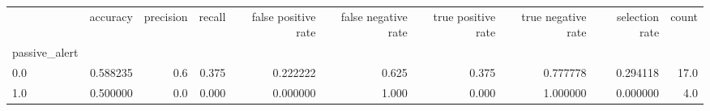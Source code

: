 \begin{tabular}{lrrrrrrrrr}
\toprule
{} &  accuracy &  precision &  recall &  false positive rate &  false negative rate &  true positive rate &  true negative rate &  selection rate &  count \\
passive\_alert &           &            &         &                      &                      &                     &                     &                 &        \\
\midrule
0.0           &  0.588235 &        0.6 &   0.375 &             0.222222 &                0.625 &               0.375 &            0.777778 &        0.294118 &   17.0 \\
1.0           &  0.500000 &        0.0 &   0.000 &             0.000000 &                1.000 &               0.000 &            1.000000 &        0.000000 &    4.0 \\
\bottomrule
\end{tabular}
